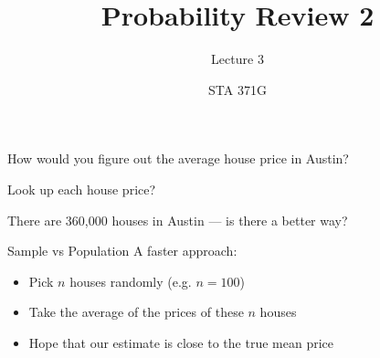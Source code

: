 \documentclass{beamer}\usepackage[]{graphicx}\usepackage[]{color}
\title{Probability Review 2}
\subtitle{Lecture 3}
\author{STA 371G}
\begin{document}
  
  

  \frame{\maketitle}



   \begin{darkframes}

	\begin{frame}[label=lists]
    \begin{center}
    	How would you figure out the average house price in Austin?
    	
    	
  		\begin{figure} 
  			\centering
  			\setlength\fboxsep{0pt}
  			\setlength\fboxrule{0.5pt}
  		\end{figure}  \pause
  			
  		
  		Look up each house price?  \pause
  		
  		There are 360,000 houses in Austin --- is there a better way?
    \end{center}
    \end{frame}    
    
    
    
    \begin{frame}[label=lists]{Sample vs Population}
    	A faster approach: \pause
   		\begin{itemize}
   			\item Pick $n$ houses randomly (e.g. $n=100$) \pause
   			\item Take the average of the prices of these $n$ houses \pause
   			\item Hope that our estimate is close to the true mean price \pause
   		\end{itemize}
   		

\end{frame}
\end{darkframes}
\end{document}
